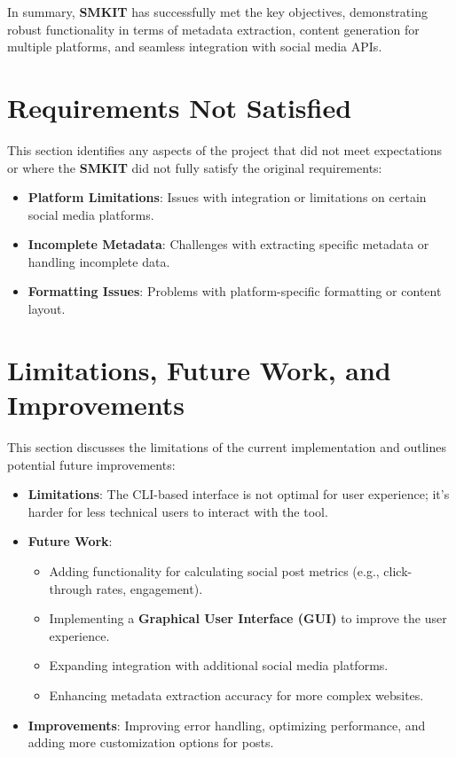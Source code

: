 In summary, \textbf{SMKIT} has successfully met the key objectives, demonstrating robust functionality in terms of metadata extraction, content generation for multiple platforms, and seamless integration with social media APIs.


\section{Requirements Not Satisfied}
\label{sec:requirements_not_satisfied}
This section identifies any aspects of the project that did not meet expectations or where the \textbf{SMKIT} did not fully satisfy the original requirements:
\begin{itemize}
    \item \textbf{Platform Limitations}: Issues with integration or limitations on certain social media platforms.
    \item \textbf{Incomplete Metadata}: Challenges with extracting specific metadata or handling incomplete data.
    \item \textbf{Formatting Issues}: Problems with platform-specific formatting or content layout.
\end{itemize}


\section{Limitations, Future Work, and Improvements}
\label{sec:limitations_future_work_improvements}
This section discusses the limitations of the current implementation and outlines potential future improvements:
\begin{itemize}
    \item \textbf{Limitations}: The CLI-based interface is not optimal for user experience; it’s harder for less technical users to interact with the tool.
    \item \textbf{Future Work}: 
    \begin{itemize}
        \item Adding functionality for calculating social post metrics (e.g., click-through rates, engagement).
        \item Implementing a \textbf{Graphical User Interface (GUI)} to improve the user experience.
        \item Expanding integration with additional social media platforms.
        \item Enhancing metadata extraction accuracy for more complex websites.
    \end{itemize}
    \item \textbf{Improvements}: Improving error handling, optimizing performance, and adding more customization options for posts.
\end{itemize}


